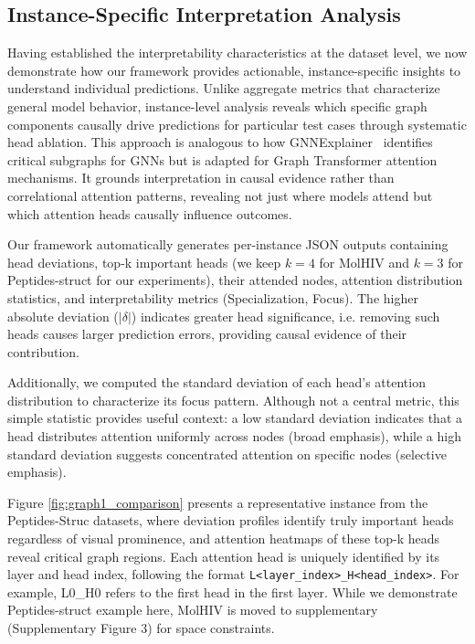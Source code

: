 \documentclass[lettersize,journal]{IEEEtran}
\begin{document}
\subsection{Instance-Specific Interpretation Analysis}
\label{subsection:Interpretability2}
Having established the interpretability characteristics at the dataset level, we now demonstrate how our framework provides actionable, instance-specific insights to understand individual predictions. Unlike aggregate metrics that characterize general model behavior, instance-level analysis reveals which specific graph components causally drive predictions for particular test cases through systematic head ablation. This approach is analogous to how GNNExplainer~\cite{ying_gnnexplainer_2019} identifies critical subgraphs for GNNs but is adapted for Graph Transformer attention mechanisms. It grounds interpretation in causal evidence rather than correlational attention patterns, revealing not just where models attend but which attention heads causally influence outcomes.

Our framework automatically generates per-instance JSON outputs containing head deviations, top-k important heads (we keep $k=4$ for MolHIV and $k=3$ for Peptides-struct for our experiments), their attended nodes, attention distribution statistics, and interpretability metrics (Specialization, Focus). The higher absolute deviation ($|\delta|$) indicates greater head significance, i.e. removing such heads causes larger prediction errors, providing causal evidence of their contribution.

Additionally, we computed the standard deviation of each head's attention distribution to characterize its focus pattern. Although not a central metric, this simple statistic provides useful context: a low standard deviation indicates that a head distributes attention uniformly across nodes (broad emphasis), while a high standard deviation suggests concentrated attention on specific nodes (selective emphasis). 

Figure \ref{fig:graph1_comparison} presents a representative instance from the Peptides-Struc datasets, where deviation profiles identify truly important heads regardless of visual prominence, and attention heatmaps of these top-k heads reveal critical graph regions. Each attention head is uniquely identified by its layer and head index, following the format \texttt{L<layer\_index>\_H<head\_index>}. For example, L0\_H0 refers to the first head in the first layer. While we demonstrate Peptides-struct example here, MolHIV is moved to supplementary (Supplementary Figure 3) for space constraints. 
\end{document}

